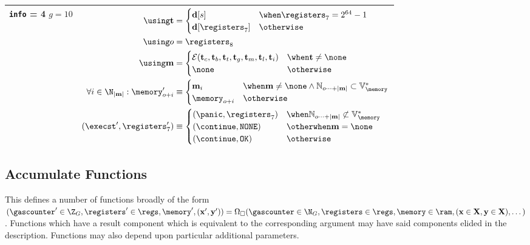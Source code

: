 \begin{longtable}{p{3.5cm} p{12.5cm}}
{  \texttt{info} = 4 \\
  $g = 10$} &
  $\begin{aligned}
    \using \mathbf{t} &= \begin{cases}
      \mathbf{d}[s] &\when \registers_7 = 2^{64} - 1 \\
      \mathbf{d}[\registers_7] &\otherwise
    \end{cases} \\
    \using o &= \registers_8 \\
    \using \mathbf{m} &= \begin{cases}
      \mathcal{E}(\mathbf{t}_c, \mathbf{t}_b, \mathbf{t}_t, \mathbf{t}_g, \mathbf{t}_m, \mathbf{t}_l, \mathbf{t}_i) &\when \mathbf{t} \ne \none \\
      \none &\otherwise
    \end{cases} \\
    \forall i \in \N_{|\mathbf{m}|} : \memory'_{o + i} &\equiv \begin{cases}
      \mathbf{m}_i & \when \mathbf{m} \ne \none \wedge \mathbb{N}_{o \dots+ |\mathbf{m}|} \subset \mathbb{V}^*_{\memory} \\
      \memory_{o + i} & \otherwise
    \end{cases} \\
    (\execst', \registers'_7) &\equiv \begin{cases}
      (\panic, \registers_7) &\when \mathbb{N}_{o \dots+ |\mathbf{m}|} \not\subset \mathbb{V}^*_{\memory}\\
      (\continue, \mathtt{NONE}) &\otherwhen \mathbf{m} = \none \\
      (\continue, \mathtt{OK}) &\otherwise \\
    \end{cases}
  \end{aligned}$ \\
  \bottomrule
\end{longtable}

\subsection{Accumulate Functions}\label{sec:accumulatefunctions}

This defines a number of functions broadly of the form $(\gascounter' \in \Z_G, \registers' \in \regs, \memory', (\mathbf{x}', \mathbf{y}')) = \Omega_\square(\gascounter \in \N_G, \registers \in \regs, \memory \in \ram, (\mathbf{x}\in \mathbf{X}, \mathbf{y}\in \mathbf{X}), \dots)$. Functions which have a result component which is equivalent to the corresponding argument may have said components elided in the description. Functions may also depend upon particular additional parameters.

